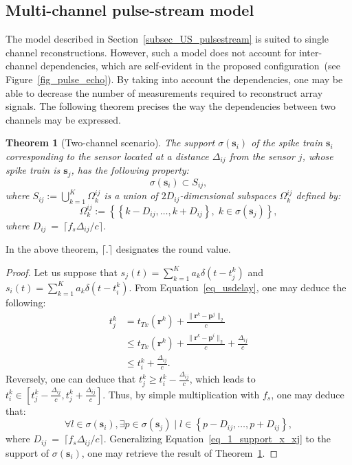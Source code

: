 \documentclass{article}
\newtheorem{theorem}{Theorem}
\newcommand{\vect}[1]{\bm{#1}}
\newcommand{\ser}[2]{#1^{#2}}
\theoremstyle{definition}
\begin{document}
\subsection{Multi-channel pulse-stream model}
\label{subsec_US_multiplechannels}
The model described in Section~\ref{subsec_US_pulsestream} is suited to single channel reconstructions. 
However, such a model does not account for inter-channel dependencies, which are self-evident in the proposed configuration~(see Figure~\ref{fig_pulse_echo}). 
By taking into account the dependencies, one may be able to decrease the number of measurements required to reconstruct array signals.
The following theorem precises the way the dependencies between two channels may be expressed.
\begin{theorem}[Two-channel scenario]
\label{th_2sens_subspace}
The support $\sigma \left(\vect{s}_i\right)$ of the spike train $\vect{s}_i$ corresponding to the sensor located at a distance $\Delta_{ij}$ from the sensor $j$, whose spike train is $\vect{s}_j$, has the following property:
	\begin{equation*}
		\sigma \left(\vect{s}_i\right) \subset S_{ij},
	\end{equation*}
	where $S_{ij} := \bigcup \limits_{k=1}^K \ser{\Omega_k}{ij}$ is a union of $2 D_{ij}$-dimensional subspaces $\ser{\Omega_k}{ij}$ defined by: 
	\begin{equation*}
		\ser{\Omega_k}{ij} := \left \lbrace \left \lbrace k - D_{ij},\dots, k+ D_{ij} \right\rbrace, \; k \in \sigma \left(\vect{s}_{j}\right) \right\rbrace,
	\end{equation*}
	where $D_{ij}~=~\lceil f_s \Delta_{ij}/ c  \rceil$. 
\end{theorem}
In the above theorem, $\lceil.\rceil$ designates the round value.
\begin{proof}
	Let us suppose that $s_j \left(t\right) = \sum_{k=1}^{K} a_k \delta \left(t - \ser{t_j}{k}\right)$ and $s_i \left(t\right) = \sum_{k=1}^{K} a_k \delta \left(t - \ser{t_i}{k}\right)$. From Equation~\eqref{eq_usdelay}, one may deduce the following:
	\begin{align*}
	\ser{t_j}{k} &= t_{Tx}\left(\vect{r}^k\right) + \frac{\|\vect{r}^k - \vect{p}^j \|_2}{c}\\
	&\leq  t_{Tx}\left(\vect{r}^k\right) + \frac{\|\vect{r}^k - \vect{p}^i \|_2}{c} + \frac{\Delta_{ij}}{c}\\
	&\leq \ser{t_i}{k} + \frac{\Delta_{ij}}{c}.
	\end{align*}
	Reversely, one can deduce that $\ser{t_j}{k} \geq \ser{t_i}{k} - \frac{\Delta_{ij}}{c}$, which leads to $\ser{t_i}{k} \in \left[\ser{t_j}{k} -\frac{\Delta_{ij}}{c}, \ser{t_j}{k} +\frac{\Delta_{ij}}{c}\right]$. Thus, by simple multiplication with $f_s$, one may deduce that:
	\begin{equation}
	\label{eq_1_support_x_xj}
		\forall l \in \sigma\left(\vect{s}_i\right), \exists p \in \sigma \left(\vect{s}_j\right) \; | \; l \in \left\lbrace p-D_{ij},\dots,p+D_{ij}\right\rbrace,
	\end{equation}
	where $D_{ij}~=~\lceil f_s \Delta_{ij}/ c  \rceil$. Generalizing Equation~\eqref{eq_1_support_x_xj} to the support of $\sigma\left(\vect{s}_i\right)$, one may retrieve the result of Theorem~\ref{th_2sens_subspace}.
\end{proof}
\end{document}
